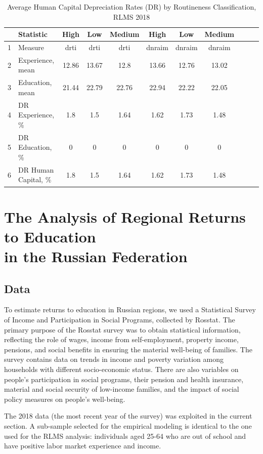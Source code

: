 \documentclass[12pt,a4paper]{article}
\numberwithin{equation}{section}
\begin{document}
\begin{table}[H]
	\centering
	\caption{Average Human Capital Depreciation Rates (DR) by Routineness Classification, RLMS 2018}
	\label{tab:7}
	\begin{tabular}{clccccccccc}
		\hline
		& \textbf{Statistic} & \textbf{High} & \textbf{Low} & \textbf{Medium} & \textbf{High} & \textbf{Low} & \textbf{Medium} \\ 
		\hline
		1 & Measure & drti & drti & drti & dnraim & dnraim & dnraim \\ 
		2 & Experience, mean & 12.86 & 13.67 & 12.8 & 13.66 & 12.76 & 13.02 \\ 
		3 & Education, mean & 21.44 & 22.79 & 22.76 & 22.94 & 22.22 & 22.05 \\ 
		\midrule
		4 & DR Experience, \% & 1.8 & 1.5 & 1.64 & 1.62 & 1.73 & 1.48 \\ 
		5 & DR Education, \% & 0 & 0 & 0 & 0 & 0 & 0 \\ 
		6 & DR Human Capital, \% & 1.8 & 1.5 & 1.64 & 1.62 & 1.73 & 1.48 \\ 
		\hline
	\end{tabular}
\end{table}

\section*{The Analysis of Regional Returns to Education \\ in the Russian Federation}

\subsection*{Data}
To estimate returns to education in Russian regions, we used a Statistical Survey of Income and Participation in Social Programs, collected by Rosstat. The primary purpose of the Rosstat survey was to obtain statistical information, reflecting the role of wages, income from self-employment, property income, pensions, and social benefits in ensuring the material well-being of families. The survey contains data on trends in income and poverty variation among households with different socio-economic status. There are also variables on people's participation in social programs, their pension and health insurance, material and social security of low-income families, and the impact of social policy measures on people's well-being.

The 2018 data (the most recent year of the survey) was exploited in the current section. A sub-sample selected for the empirical modeling is identical to the one used for the RLMS analysis: individuals aged 25-64 who are out of school and have positive labor market experience and income.
\end{document}

